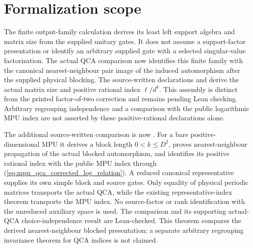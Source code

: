 \documentclass{article}
\begin{document}
\section{Formalization scope}

The finite output-family calculation derives its least left support
algebra and matrix size from the supplied unitary gates. It does not
assume a support-factor presentation or identify an arbitrary supplied
gate with a selected singular-value factorization. The actual
QCA comparison now identifies this finite family with the canonical
nearest-neighbour pair image of the induced automorphism after the
supplied physical blocking. The source-written declarations
 and
derive the actual matrix size and positive rational index $\ell/d^k$.
This assembly is distinct from the printed factor-of-two correction and
remains pending Lean checking. Arbitrary regrouping independence and a
comparison with the public logarithmic MPU index are not asserted by
these positive-rational declarations alone.

The additional source-written comparison is now
.
For a bare positive-dimensional MPU it derives a block length
$0<k\le D^2$, proves nearest-neighbour propagation of the actual
blocked automorphism, and identifies its positive rational index with
the public MPU index through
(\ref{eq:mpu_qca_corrected_log_relation}). A reduced canonical
representative supplies its own simple block and source gates.
Only equality of physical periodic matrices transports the actual QCA,
while the existing representative-index theorem transports the MPU
index. No source-factor or rank identification with the unreduced
auxiliary space is used. The comparison and its supporting actual-QCA
choice-independence result are Lean-checked. This theorem compares the derived
nearest-neighbour blocked presentation; a separate arbitrary regrouping
invariance theorem for QCA indices is not claimed.



\end{document}
